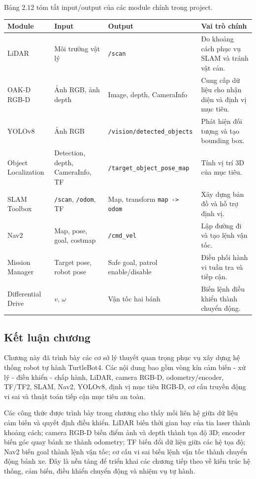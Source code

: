 Bảng 2.12 tóm tắt input/output của các module chính trong project.

\renewcommand{\arraystretch}{1.25}
\begin{longtable}{|
  >{\raggedright\arraybackslash}p{}|
  >{\raggedright\arraybackslash}p{}|
  >{\raggedright\arraybackslash}p{}|
  >{\raggedright\arraybackslash}p{}|}
\hline
\textbf{Module} & \textbf{Input} & \textbf{Output} & \textbf{Vai trò chính} \\ \hline
\hline
\endhead
\hline
\endlastfoot
LiDAR & Môi trường vật lý & \texttt{/scan} & Đo khoảng cách phục vụ SLAM
và tránh vật cản. \\ \hline
OAK-D RGB-D & Ảnh RGB, ảnh depth & Image, depth, CameraInfo & Cung cấp
dữ liệu cho nhận diện và định vị mục tiêu. \\ \hline
YOLOv8 & Ảnh RGB & \texttt{/vision/}\allowbreak\texttt{detected\_objects} & Phát hiện đối
tượng và tạo bounding box. \\ \hline
Object Localization & Detection, depth, CameraInfo, TF &
\texttt{/target\_}\allowbreak\texttt{object\_}\allowbreak\texttt{pose\_map} & Tính vị trí 3D của mục tiêu. \\ \hline
SLAM Toolbox & \texttt{/scan}, \texttt{/odom}, TF & Map, transform
\texttt{map -> odom} & Xây dựng bản đồ và hỗ trợ định
vị. \\ \hline
Nav2 & Map, pose, goal, costmap & \texttt{/cmd\_vel} & Lập đường đi và
tạo lệnh vận tốc. \\ \hline
Mission Manager & Target pose, robot pose & Safe goal, patrol
enable/disable & Điều phối hành vi tuần tra và tiếp cận. \\ \hline
Differential Drive & \(v\), \(\omega\) & Vận tốc hai bánh & Biến lệnh
điều khiển thành chuyển động. \\ \hline
\end{longtable}

\subsection{Kết luận chương}\label{subsec:theory-conclusion}

Chương này đã trình bày các cơ sở lý thuyết quan trọng phục vụ xây dựng
hệ thống robot tự hành TurtleBot4. Các nội dung bao gồm vòng kín cảm
biến - xử lý - điều khiển - chấp hành, LiDAR, camera RGB-D,
odometry/encoder, TF/TF2, SLAM, Nav2, YOLOv8, định vị mục tiêu RGB-D, cơ
cấu truyền động vi sai và thuật toán tiếp cận mục tiêu an toàn.

Các công thức được trình bày trong chương cho thấy mối liên hệ giữa dữ
liệu cảm biến và quyết định điều khiển. LiDAR biến thời gian bay của tia
laser thành khoảng cách; camera RGB-D biến điểm ảnh và depth thành tọa
độ 3D; encoder biến góc quay bánh xe thành odometry; TF biến đổi dữ liệu
giữa các hệ tọa độ; Nav2 biến goal thành lệnh vận tốc; cơ cấu vi sai
biến lệnh vận tốc thành chuyển động bánh xe. Đây là nền tảng để triển
khai các chương tiếp theo về kiến trúc hệ thống, cảm biến, điều khiển
chuyển động và nhiệm vụ tự hành.